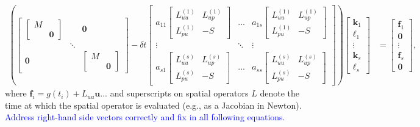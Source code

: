 \documentclass[a4paper,10pt]{article}
\newcommand{\tcb}{\textcolor{blue}}
\begin{document}
\begin{align}\label{eq:k0}
\left( \begin{bmatrix} \begin{bmatrix} M \\ & \mathbf{0}\end{bmatrix} & &
	\mathbf{0} \\ & \ddots \\ \mathbf{0} & & \begin{bmatrix} M \\ & \mathbf{0}\end{bmatrix}
		\end{bmatrix}
	- \delta t \begin{bmatrix} a_{11}\begin{bmatrix} L^{(1)}_{uu} & L^{(1)}_{up} \\ L^{(1)}_{pu} & -S \end{bmatrix} & ... & a_{1s}\begin{bmatrix} L^{(1)}_{uu} & L^{(1)}_{up} \\ L^{(1)}_{pu} & -S \end{bmatrix} \\
	\vdots & \ddots & \vdots \\ a_{s1}\begin{bmatrix} L^{(s)}_{uu} & L^{(s)}_{up} \\ L^{(s)}_{pu} & -S \end{bmatrix} & ... & a_{ss} \begin{bmatrix} L^{(s)}_{uu} & L^{(s)}_{up} \\ L^{(s)}_{pu} & -S \end{bmatrix} \end{bmatrix} \right)
	\begin{bmatrix} \mathbf{k}_1 \\ \ell_1 \\ \vdots \\ \mathbf{k}_s \\ \ell_s\end{bmatrix} 
& = \begin{bmatrix} \mathbf{f}_1 \\ \mathbf{0} \\ \vdots \\ \mathbf{f}_s \\ \mathbf{0} \end{bmatrix},
\end{align}
%
where $\mathbf{f}_i = g(t_i) + L_{uu}\mathbf{u} ...$ and superscripts on
spatial operators $L$ denote the time at which the spatial operator is
evaluated (e.g., as a Jacobian in Newton). \tcb{Address right-hand side
vectors correctly and fix in all following equations.}
\end{document}
